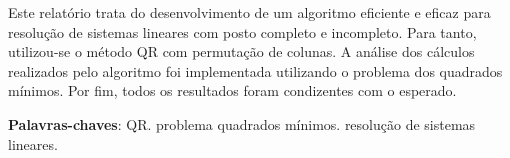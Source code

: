 \documentclass[
	12pt,				%
	openright,			%
	oneside,			%
	a4paper,			%
	english,			%
	french,				%
	spanish,			%
	brazil,				%
	]{abntex2}
\begin{document}
\frenchspacing 


\imprimircapa




\setlength{\absparsep}{18pt} %
\begin{resumo}
Este relatório trata do desenvolvimento de um algoritmo eficiente e eficaz
para resolução de sistemas lineares com posto completo e incompleto. Para 
tanto, utilizou-se o método QR com permutação de colunas. A análise dos
cálculos realizados pelo algoritmo foi implementada utilizando o problema
dos quadrados mínimos. Por fim, todos os resultados foram condizentes com 
o esperado.

 \noindent
 \textbf{Palavras-chaves}: QR. problema quadrados mínimos. resolução de sistemas lineares.
\end{resumo}

%
%
%
%
%
%
\end{document}

